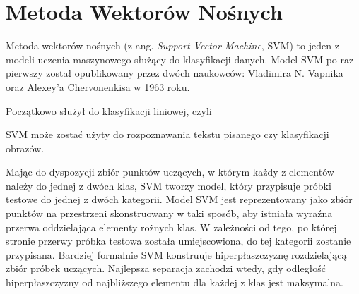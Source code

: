 \section{Metoda Wektorów Nośnych}
Metoda wektorów nośnych (z ang. \textit{Support Vector Machine}, SVM) to jeden z modeli uczenia maszynowego służący do klasyfikacji danych. Model SVM po raz pierwszy został opublikowany przez dwóch naukowców: Vladimira N. Vapnika oraz Alexey'a Chervonenkisa w 1963 roku. 

Początkowo służył do klasyfikacji liniowej, czyli 

SVM może zostać użyty do rozpoznawania tekstu pisanego czy klasyfikacji obrazów.

Mając do dyspozycji zbiór punktów uczących, w którym każdy z elementów należy do jednej z dwóch klas, SVM tworzy model, który przypisuje próbki testowe do jednej z dwóch kategorii. Model SVM jest reprezentowany jako zbiór punktów na przestrzeni skonstruowany w taki sposób, aby istniała wyraźna przerwa oddzielająca elementy rożnych klas. W zależności od tego, po której stronie przerwy próbka testowa została umiejscowiona, do tej kategorii zostanie przypisana. Bardziej formalnie SVM konstruuje hiperpłaszczyznę rozdzielającą zbiór próbek uczących. Najlepsza separacja zachodzi wtedy, gdy odległość hiperpłaszczyzny od najbliższego elementu dla każdej z klas jest maksymalna. 

